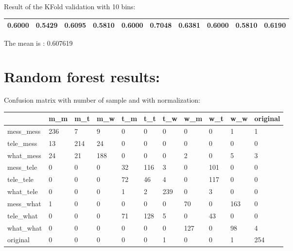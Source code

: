 Result of the KFold validation with 10 bins:
 {\def\arraystretch{1.3} 
 \begin{table}[H] 
\centering 
\begin{tabular}{|l |l |l |l |l |l |l |l |l |l |}  
\hline 
0.6000&
0.5429&
0.6095&
0.5810&
0.6000&
0.7048&
0.6381&
0.6000&
0.5810&
0.6190\\ \hline  

\end{tabular} 
\end{table} }

The mean is : 0.607619\section{Random forest results:} 
Confusion matrix with number of sample and with normalization:
 {\def\arraystretch{1.3} 
 \begin{table}[H] 
\centering 
\begin{tabular}{|l|l|l|l|l|l|l|l|l|l|l|} 
\hline 
  &m\_m  &m\_t  &m\_w  &t\_m  &t\_t  &t\_w  &w\_m  &w\_t  &w\_w  &original  \\ \hline
mess\_mess  &236  &7  &9  &0  &0  &0  &0  &0  &1  &1  \\ \hline
tele\_mess  &13  &214  &24  &0  &0  &0  &0  &0  &0  &0  \\ \hline
what\_mess  &24  &21  &188  &0  &0  &0  &2  &0  &5  &3  \\ \hline
mess\_tele  &0  &0  &0  &32  &116  &3  &0  &101  &0  &0  \\ \hline
tele\_tele  &0  &0  &0  &72  &46  &4  &0  &117  &0  &0  \\ \hline
what\_tele  &0  &0  &0  &1  &2  &239  &0  &3  &0  &0  \\ \hline
mess\_what  &1  &0  &0  &0  &0  &0  &70  &0  &163  &0  \\ \hline
tele\_what  &0  &0  &0  &71  &128  &5  &0  &43  &0  &0  \\ \hline
what\_what  &0  &0  &0  &0  &0  &0  &127  &0  &98  &4  \\ \hline
original  &0  &0  &0  &0  &0  &1  &0  &0  &1  &254  \\ \hline
\end{tabular} 
\end{table} }

